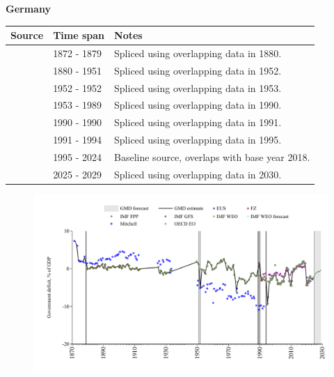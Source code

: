 \documentclass[12pt,a4paper,landscape]{article}
\begin{document}
\begin{adjustbox}{max totalsize={\paperwidth}{\paperheight},center}
\begin{minipage}[t][\textheight][t]{\textwidth}
\vspace*{0.5cm}
{}
\begin{center}
{\Large\bfseries Germany}
\end{center}
\vspace{0.5cm}
\begin{table}[H]
\centering
\small
\begin{tabular}{|l|l|l|}
\hline
\textbf{Source} & \textbf{Time span} & \textbf{Notes} \\
\hline
\rowcolor{white}\cite{Mitchell}& 1872 - 1879 &Spliced using overlapping data in 1880.\\
\rowcolor{lightgray}\cite{IMF_FPP}& 1880 - 1951 &Spliced using overlapping data in 1952.\\
\rowcolor{white}\cite{Mitchell}& 1952 - 1952 &Spliced using overlapping data in 1953.\\
\rowcolor{lightgray}\cite{IMF_FPP}& 1953 - 1989 &Spliced using overlapping data in 1990.\\
\rowcolor{white}\cite{IMF_GFS}& 1990 - 1990 &Spliced using overlapping data in 1991.\\
\rowcolor{lightgray}\cite{IMF_WEO}& 1991 - 1994 &Spliced using overlapping data in 1995.\\
\rowcolor{white}\cite{EUS}& 1995 - 2024 &Baseline source, overlaps with base year 2018.\\
\rowcolor{lightgray}\cite{IMF_WEO_forecast}& 2025 - 2029 &Spliced using overlapping data in 2030.\\
\hline
\end{tabular}
\end{table}
\begin{figure}[H]
\centering
\includegraphics[width=\textwidth,height=0.6\textheight,keepaspectratio]{graphs/DEU_govdef_GDP.pdf}
\end{figure}
\end{minipage}
\end{adjustbox}
\end{document}
